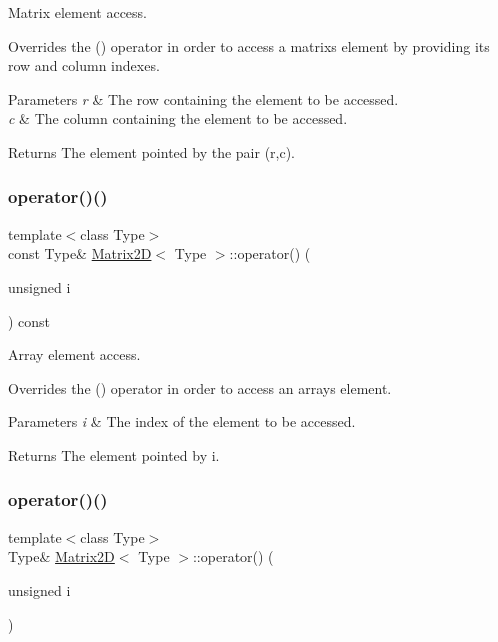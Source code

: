 Matrix element access. 

Overrides the {\ttfamily ()} operator in order to access a matrix\textquotesingle{}s element by providing its row and column indexes. 
\begin{DoxyParams}{Parameters}
{\em r} & The row containing the element to be accessed. \\
\hline
{\em c} & The column containing the element to be accessed. \\
\hline
\end{DoxyParams}
\begin{DoxyReturn}{Returns}
The element pointed by the pair (r,c). 
\end{DoxyReturn}
\mbox{\label{classMatrix2D_ac5b60589d9d867150e045887aaebe5b0}} 
\subsubsection{\texorpdfstring{operator()()}{operator()()}\hspace{0.1cm}{\footnotesize\ttfamily [3/4]}}
{\footnotesize\ttfamily template$<$class Type$>$ \\
const Type\& \hyperlink{classMatrix2D}{Matrix2D}$<$ Type $>$\+::operator() (\begin{DoxyParamCaption}\item[{unsigned}]{i }\end{DoxyParamCaption}) const\hspace{0.3cm}{\ttfamily [inline]}}



Array element access. 

Overrides the {\ttfamily ()} operator in order to access an array\textquotesingle{}s element. 
\begin{DoxyParams}{Parameters}
{\em i} & The index of the element to be accessed. \\
\hline
\end{DoxyParams}
\begin{DoxyReturn}{Returns}
The element pointed by i. 
\end{DoxyReturn}
\mbox{\label{classMatrix2D_afebec0a3fc73a157fe8044416fb6d0b3}} 
\subsubsection{\texorpdfstring{operator()()}{operator()()}\hspace{0.1cm}{\footnotesize\ttfamily [4/4]}}
{\footnotesize\ttfamily template$<$class Type$>$ \\
Type\& \hyperlink{classMatrix2D}{Matrix2D}$<$ Type $>$\+::operator() (\begin{DoxyParamCaption}\item[{unsigned}]{i }\end{DoxyParamCaption})\hspace{0.3cm}{\ttfamily [inline]}}




